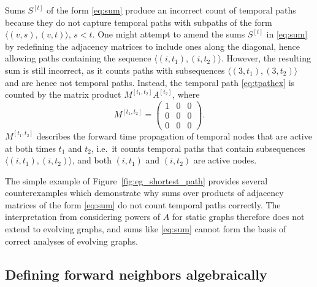 \documentclass[10pt,conference,compsocconf]{IEEEtran}
\theoremstyle{definition}
\begin{document}
Sums $S^{[t]}$ of the form \eqref{eq:sum} produce an incorrect count of temporal
paths because they do not capture temporal paths with subpaths of the form
$\langle (v, s), (v, t) \rangle$, $s < t$.
One might attempt to amend the sums $S^{[t]}$ in \eqref{eq:sum} by redefining
the adjacency matrices to include ones along the diagonal, hence allowing
paths containing the sequence $\langle (i, t_1), (i, t_2) \rangle$. However, the resulting
sum is still incorrect, as it counts paths with subsequences $\langle (3, t_1), (3, t_2) \rangle$
and are hence not temporal paths. Instead, the temporal path \eqref{eq:tpathex}
is counted by the matrix product $M^{[t_1, t_2]} A^{[t_2]}$, where
\begin{equation}
    M^{[t_1, t_2]} = \begin{pmatrix}1 & 0 & 0 \\ 0 & 0 & 0 \\ 0 & 0 & 0\end{pmatrix}.
\label{eq:m-example}
\end{equation}
$M^{[t_1, t_2]}$ describes the forward time propagation of temporal nodes that
are active at both times $t_1$ and $t_2$, i.e.\ it counts
temporal paths that contain subsequences $\langle (i, t_1), (i, t_2) \rangle$,
and both $(i, t_1)$ and $(i, t_2)$ are active nodes.

The simple example of Figure~\ref{fig:eg_shortest_path} provides several
counterexamples which demonstrate why sums over products of adjacency matrices of
the form \eqref{eq:sum} do not count temporal paths correctly. The interpretation
from considering powers of $A$ for static graphs therefore does not extend to
evolving graphs, and sums like \eqref{eq:sum} cannot form the basis of correct
analyses of evolving graphs.




\subsection{Defining forward neighbors algebraically}
\end{document}
